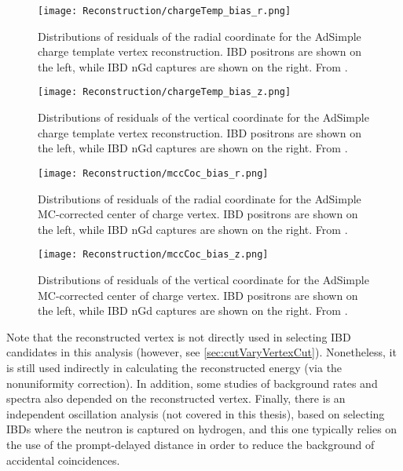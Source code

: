 \documentclass[../thesis.tex]{subfiles}
\begin{document}
\begin{figure}[h]
  \texttt{[image: Reconstruction/chargeTemp\_bias\_r.png]}
  \caption{Distributions of residuals of the radial coordinate for the AdSimple charge template vertex reconstruction. IBD positrons are shown on the left, while IBD nGd captures are shown on the right. From \cite{adsimple2}.}
  \label{fig:chargeTemp_bias_r}
\end{figure}

\begin{figure}[h]
  \texttt{[image: Reconstruction/chargeTemp\_bias\_z.png]}
  \caption{Distributions of residuals of the vertical coordinate for the AdSimple charge template vertex reconstruction. IBD positrons are shown on the left, while IBD nGd captures are shown on the right. From \cite{adsimple2}.}
  \label{fig:chargeTemp_bias_z}
\end{figure}

\begin{figure}[h]
  \texttt{[image: Reconstruction/mccCoc\_bias\_r.png]}
  \caption{Distributions of residuals of the radial coordinate for the AdSimple MC-corrected center of charge vertex. IBD positrons are shown on the left, while IBD nGd captures are shown on the right. From \cite{adsimple2}.}
  \label{fig:mccCoc_bias_r}
\end{figure}

\begin{figure}[h]
  \texttt{[image: Reconstruction/mccCoc\_bias\_z.png]}
  \caption{Distributions of residuals of the vertical coordinate for the AdSimple MC-corrected center of charge vertex. IBD positrons are shown on the left, while IBD nGd captures are shown on the right. From \cite{adsimple2}.}
  \label{fig:mccCoc_bias_z}
\end{figure}

Note that the reconstructed vertex is not directly used in selecting IBD candidates in this analysis (however, see \autoref{sec:cutVaryVertexCut}). Nonetheless, it is still used indirectly in calculating the reconstructed energy (via the nonuniformity correction). In addition, some studies of background rates and spectra also depended on the reconstructed vertex. Finally, there is an independent oscillation analysis (not covered in this thesis), based on selecting IBDs where the neutron is captured on hydrogen, and this one typically relies on the use of the prompt-delayed distance in order to reduce the background of accidental coincidences.
\end{document}
